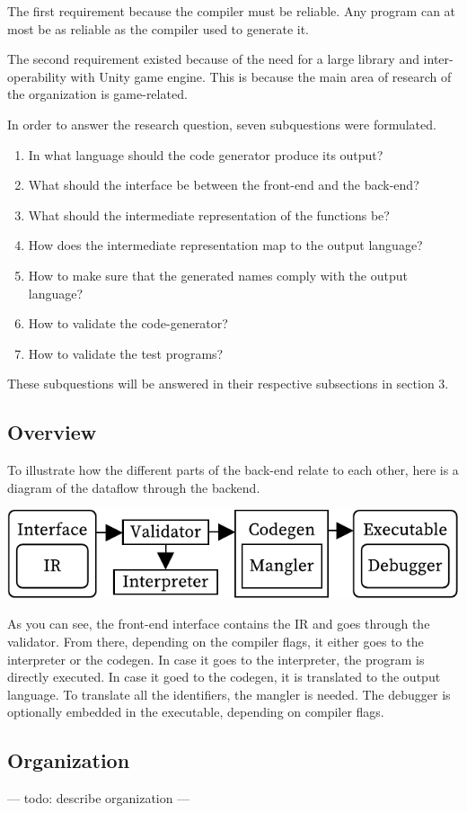 The first requirement  because the compiler must be reliable.
Any program can at most be as reliable as the compiler used to generate it.

\label{whydotnet}
The second requirement existed because of the need for a large library and inter-operability with Unity game engine.
This is because the main area of research of the organization is game-related.

In order to answer the research question, seven subquestions were formulated.

\begin{enumerate}
    \item In what language should the code generator produce its output?
    \item What should the interface be between the front-end and the back-end?
    \item What should the intermediate representation of the functions be?
    \item How does the intermediate representation map to the output language?
    \item How to make sure that the generated names comply with the output language?
    \item How to validate the code-generator?
    \item How to validate the test programs?
\end{enumerate}

These subquestions will be answered in their respective subsections in section 3.

\subsection{Overview}

To illustrate how the different parts of the back-end relate to each other, here is a diagram of the dataflow through the backend.

\includegraphics[width=\columnwidth]{overview}

As you can see, the front-end interface contains the IR and goes through the validator.
From there, depending on the compiler flags, it either goes to the interpreter or the codegen.
In case it goes to the interpreter, the program is directly executed.
In case it goed to the codegen, it is translated to the output language.
To translate all the identifiers, the mangler is needed.
The debugger is optionally embedded in the executable, depending on compiler flags.

\subsection{Organization}
--- todo: describe organization ---

